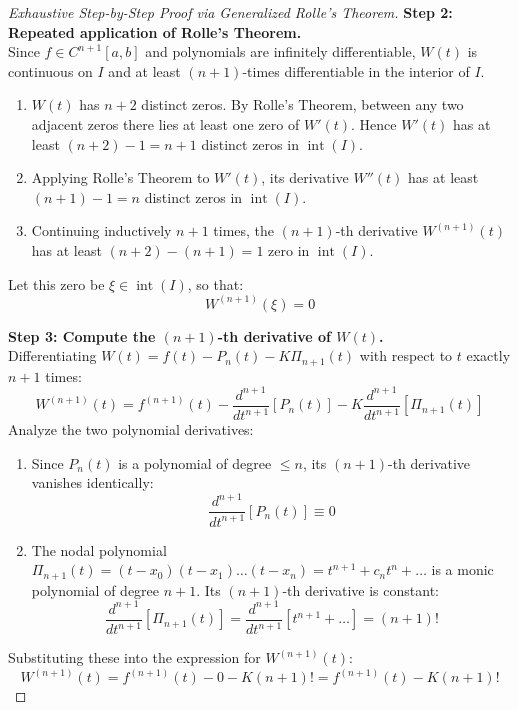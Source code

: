 \begin{proof}[Exhaustive Step-by-Step Proof via Generalized Rolle's Theorem]
\medskip
\noindent\textbf{Step 2: Repeated application of Rolle's Theorem.} \\
Since $f \in C^{n+1}[a, b]$ and polynomials are infinitely differentiable, $W(t)$ is continuous on $I$ and at least $(n+1)$-times differentiable in the interior of $I$.
\begin{enumerate}
    \item $W(t)$ has $n + 2$ distinct zeros. By Rolle's Theorem, between any two adjacent zeros there lies at least one zero of $W'(t)$. Hence $W'(t)$ has at least $(n + 2) - 1 = n + 1$ distinct zeros in $\operatorname{int}(I)$.
    \item Applying Rolle's Theorem to $W'(t)$, its derivative $W''(t)$ has at least $(n + 1) - 1 = n$ distinct zeros in $\operatorname{int}(I)$.
    \item Continuing inductively $n+1$ times, the $(n+1)$-th derivative $W^{(n+1)}(t)$ has at least $(n + 2) - (n + 1) = 1$ zero in $\operatorname{int}(I)$.
\end{enumerate}
Let this zero be $\xi \in \operatorname{int}(I)$, so that:
\begin{equation}
    W^{(n+1)}(\xi) = 0
\end{equation}

\noindent\textbf{Step 3: Compute the $(n+1)$-th derivative of $W(t)$.} \\
Differentiating $W(t) = f(t) - P_n(t) - K \Pi_{n+1}(t)$ with respect to $t$ exactly $n+1$ times:
\begin{equation}
    W^{(n+1)}(t) = f^{(n+1)}(t) - \frac{d^{n+1}}{dt^{n+1}}[P_n(t)] - K \frac{d^{n+1}}{dt^{n+1}}[\Pi_{n+1}(t)]
\end{equation}
Analyze the two polynomial derivatives:
\begin{enumerate}
    \item Since $P_n(t)$ is a polynomial of degree $\le n$, its $(n+1)$-th derivative vanishes identically:
    \begin{equation}
        \frac{d^{n+1}}{dt^{n+1}}[P_n(t)] \equiv 0
    \end{equation}
    \item The nodal polynomial $\Pi_{n+1}(t) = (t - x_0)(t - x_1)\dots(t - x_n) = t^{n+1} + c_n t^n + \dots$ is a monic polynomial of degree $n+1$. Its $(n+1)$-th derivative is constant:
    \begin{equation}
        \frac{d^{n+1}}{dt^{n+1}}[\Pi_{n+1}(t)] = \frac{d^{n+1}}{dt^{n+1}}\left[ t^{n+1} + \dots \right] = (n+1)!
    \end{equation}
\end{enumerate}
Substituting these into the expression for $W^{(n+1)}(t)$:
\begin{equation}
    W^{(n+1)}(t) = f^{(n+1)}(t) - 0 - K (n+1)! = f^{(n+1)}(t) - K (n+1)!
\end{equation}


\end{proof}
